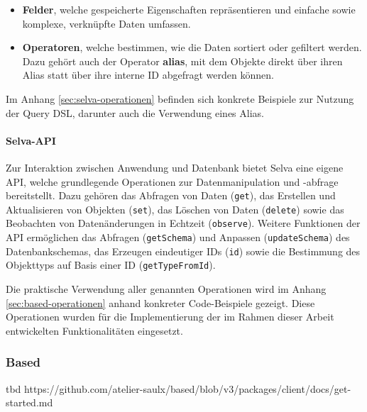 \begin{itemize} \item \textbf{Felder}, welche gespeicherte Eigenschaften repräsentieren und einfache sowie komplexe, verknüpfte Daten umfassen.
\item \textbf{Operatoren}, welche bestimmen, wie die Daten sortiert oder gefiltert werden. Dazu gehört auch der Operator \textbf{alias}, mit dem Objekte direkt über ihren Alias statt über ihre interne ID abgefragt werden können.
\end{itemize}

Im Anhang \ref{sec:selva-operationen} befinden sich konkrete Beispiele zur Nutzung der Query DSL, darunter auch die Verwendung eines Alias.

\paragraph{Selva-API}
Zur Interaktion zwischen Anwendung und Datenbank bietet Selva eine eigene API, welche grundlegende Operationen zur Datenmanipulation und -abfrage bereitstellt. Dazu gehören das Abfragen von Daten (\texttt{get}), das Erstellen und Aktualisieren von Objekten (\texttt{set}), das Löschen von Daten (\texttt{delete}) sowie das Beobachten von Datenänderungen in Echtzeit (\texttt{observe}). Weitere Funktionen der API ermöglichen das Abfragen (\texttt{getSchema}) und Anpassen (\texttt{updateSchema}) des Datenbankschemas, das Erzeugen eindeutiger IDs (\texttt{id}) sowie die Bestimmung des Objekttyps auf Basis einer ID (\texttt{getTypeFromId}).

Die praktische Verwendung aller genannten Operationen wird im Anhang \ref{sec:based-operationen} anhand konkreter Code-Beispiele gezeigt. Diese Operationen wurden für die Implementierung der im Rahmen dieser Arbeit entwickelten Funktionalitäten eingesetzt.

\subsubsection*{Based}
tbd
https://github.com/atelier-saulx/based/blob/v3/packages/client/docs/get-started.md


